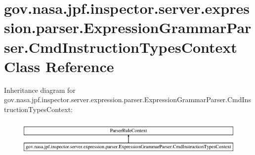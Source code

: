 \hypertarget{classgov_1_1nasa_1_1jpf_1_1inspector_1_1server_1_1expression_1_1parser_1_1_expression_grammar_pab3186941420d0c466c6d856eeff6b665}{}\section{gov.\+nasa.\+jpf.\+inspector.\+server.\+expression.\+parser.\+Expression\+Grammar\+Parser.\+Cmd\+Instruction\+Types\+Context Class Reference}
\label{classgov_1_1nasa_1_1jpf_1_1inspector_1_1server_1_1expression_1_1parser_1_1_expression_grammar_pab3186941420d0c466c6d856eeff6b665}
Inheritance diagram for gov.\+nasa.\+jpf.\+inspector.\+server.\+expression.\+parser.\+Expression\+Grammar\+Parser.\+Cmd\+Instruction\+Types\+Context\+:\begin{figure}[H]
\begin{center}
\leavevmode
\includegraphics[height=1.833061cm]{classgov_1_1nasa_1_1jpf_1_1inspector_1_1server_1_1expression_1_1parser_1_1_expression_grammar_pab3186941420d0c466c6d856eeff6b665}
\end{center}
\end{figure}
